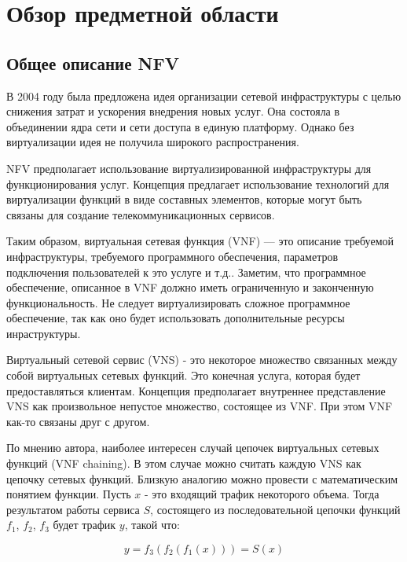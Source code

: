 \documentclass[oneside,final,14pt,a4paper]{extreport}
\begin{document}
\chapter{Обзор предметной области}
\label{chap:overview_subject_area}

\section{Общее описание NFV}
\label{sec:nfv_description}
В 2004 году была предложена идея организации сетевой инфраструктуры с целью снижения затрат и ускорения внедрения новых услуг. Она состояла в объединении ядра сети и сети доступа в единую платформу. Однако без виртуализации идея не получила широкого распространения.\cite{nfv-state2}

NFV предполагает использование виртуализированной инфраструктуры для функционирования услуг. Концепция предлагает использование технологий для виртуализации функций в виде составных элементов, которые могут быть связаны для создание телекоммуникационных сервисов. 

Таким образом, виртуальная сетевая функция (VNF) --- это описание требуемой инфраструктуры, требуемого программного обеспечения, параметров подключения пользователей к это услуге и т.д.. Заметим, что программное обеспечение, описанное в VNF должно иметь ограниченную и законченную функциональность. Не следует виртуализировать сложное программное обеспечение, так как оно будет использовать дополнительные ресурсы инраструктуры.

Виртуальный сетевой сервис (VNS) - это некоторое множество связанных между собой виртуальных сетевых функций. Это конечная услуга, которая будет предоставляться клиентам. Концепция предполагает внутреннее представление VNS как произвольное непустое множество, состоящее из VNF. При этом VNF как-то связаны друг с другом.

По мнению автора, наиболее интересен случай цепочек виртуальных сетевых функций (VNF chaining). В этом случае можно считать каждую VNS как цепочку сетевых функций. Близкую аналогию можно провести с математическим понятием функции. Пусть $x$ - это входящий трафик некоторого объема. Тогда результатом работы сервиса $S$, состоящего из последовательной цепочки функций $f_{1}$, $f_{2}$, $f_{3}$ будет трафик $y$, такой что:

\begin{equation}
	\label{eq:service_example}
	y = f_3(f_2(f_1(x))) = S(x)
\end{equation}
\end{document}
